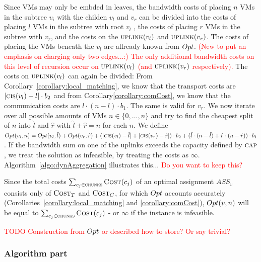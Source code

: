 \documentclass[9pt,twocolumn]{scrartcl}
\newcommand{\Capacity}{\ensuremath{\textsc{cap}}}
\newcommand{\Chunk}{\ensuremath{c}}
\newcommand{\carlo}[1]{\textcolor{red}{#1}}
\newcommand{\VmChunkAssignment}{\ensuremath{ASS_v}}
\newcommand{\SubstrateNode}{\ensuremath{v}}
\newcommand{\Chunks}{\ensuremath{\textsc{chunks}}}
\newcommand{\Cost}{\textsc{Cost}}
\newcommand{\CostCom}{\ensuremath{b_1}}
\newcommand{\CostTrans}{\ensuremath{b_2}}
\newcommand{\Vms}{\ensuremath{n}}
\begin{document}
Since VMs may only be embded in leaves, the bandwidth costs of placing $n$ VMs
in the subtree $\SubstrateNode_i$ with the childen $\SubstrateNode_l$ and
$\SubstrateNode_r$ can be divided into the costs of placing $l$ VMs in the
subtree with root $\SubstrateNode_l$ , the costs of placing
$r$ VMs in the subtree with $\SubstrateNode_r$, and the costs on the
$\Uplink(\SubstrateNode_l)$ and $\Uplink(\SubstrateNode_r)$. The costs of
placing the VMs beneath the $\SubstrateNode_l$ are allready known from
$Opt$. \carlo{(New to put an emphasis on charging only two edges...:) The only
additional bandwidth costs on this level of recursion occur on
$\Uplink(\SubstrateNode_l)$ (and $\Uplink(\SubstrateNode_r)$ respectively).}
The costs on $\Uplink(\SubstrateNode_l)$ can again be divided: From
Corollary~\ref{corollary:local_matching}, we know that the transport costs are
 $|\ChunkCount(\SubstrateNode_l) - l| \cdot \CostTrans$ and from
Corollary\ref{corollary:comCost}, we know that the communication costs are
$l\cdot (\Vms - l) \cdot \CostCom$. The same is valid for $\SubstrateNode_r$.
We now iterate over all possible amounts of VMs $n \in \{0,\dots,\Vms\}$ and
try to find the cheapest split of $n$ into $\hat l$ and $\hat r$ with
$\hat l + \hat r = n$ for each $n$. We define $\Opt(\SubstrateNode_i, n) =
\Opt(\SubstrateNode_{l}, \hat l) + \Opt(\SubstrateNode_{r}, \hat r) +
(|\ChunkCount(\SubstrateNode_{l}) - \hat
l|+|\ChunkCount(\SubstrateNode_{r}) - \hat r|) \cdot \CostTrans + (\hat
l\cdot (\Vms - \hat l) + \hat r\cdot (\Vms - \hat r)) \cdot \CostCom$. If the
bandwidth sum on one of the uplinks exceeds the capacity defined by
$\Capacity$, we treat the solution as infeasible, by treating the costs as
$\infty$. Algorithm~\ref{algo:dynAggregation} illustrates this... \carlo{Do you
want to keep this?}

Since the total costs $\sum_{\Chunk_j \in
\Chunks}\Cost(\Chunk_j)$ of an optimal assignment $\VmChunkAssignment$
consists only of $\Cost_T$ and $\Cost_C$, for which $Opt$ accounts accurately
(Corollaries~\ref{corollary:local_matching} and \ref{corollary:comCost}),
$\Opt(\SubstrateNode, \Vms)$ will be equal to $\sum_{\Chunk_j \in
\Chunks}\Cost(\Chunk_j)$ - or $\infty$ if the instance is infeasible.

\carlo{TODO Construction from $Opt$ or described how to store? Or say trivial?}

\subsubsection{Algorithm part}
\end{document}
